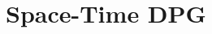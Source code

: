 \documentclass[18pt,xcolor=table]{beamer}
\begin{document}





\section{Space-Time DPG}
\end{document}
